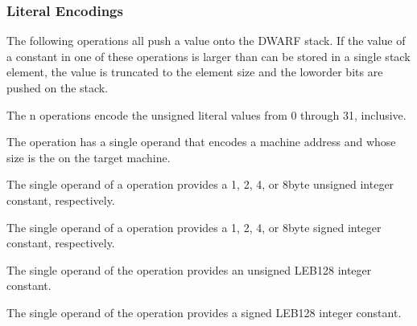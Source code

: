 \subsubsection{Literal Encodings}
\label{chap:literalencodings}
The 
following operations all push a value onto the DWARF
stack. 
If the value of a constant in one of these operations
is larger than can be stored in a single stack element, the
value is truncated to the element size and the low\dash order bits
are pushed on the stack.
\begin{enumerate}[1. ]
The n operations encode the unsigned literal values
from 0 through 31, inclusive.

The  operation has a single operand that encodes
a machine address and whose size is the 
on the target machine.

The single operand of a  operation provides a 1,
2, 4, or 8\dash byte unsigned integer constant, respectively.

The single operand of a  operation provides a 1,
2, 4, or 8\dash byte signed integer constant, respectively.

The single operand of the  operation provides
an unsigned LEB128 integer constant.

The single operand of the  operation provides
a signed LEB128 integer constant.

\end{enumerate}



